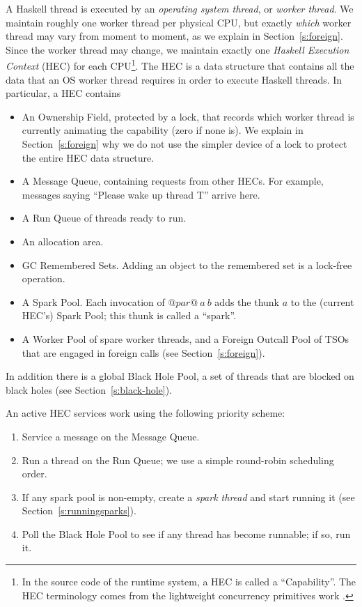 \documentclass[twocolumn,9pt]{sigplanconf}
\begin{document}
A Haskell thread is executed by an \emph{operating system thread}, or
\emph{worker thread}.  We maintain roughly one worker thread per
physical CPU, but exactly \emph{which} worker thread may vary from moment
to moment, as we explain in Section~\ref{s:foreign}.
Since the worker thread may change, we maintain exactly one
\emph{Haskell Execution Context} (HEC) for each CPU\footnote{
In the source code of the runtime system, a HEC is called a
``Capability''.  The HEC terminology comes from the lightweight
concurrency primitives work \cite{concsubstrate07}.}.
The HEC is a
data structure that contains all the data that an OS worker thread
requires in order to execute Haskell threads.  In particular, a HEC
contains
\begin{itemize}
\item An Ownership Field, protected by a lock, that 
records which worker thread is currently animating the capability
(zero if none is).  We explain in Section~\ref{s:foreign} 
why we do not use the simpler
device of a lock to protect the entire HEC data structure.

\item A Message Queue, containing requests from other HECs.  For
example, messages saying ``Please wake up thread T'' arrive here.

\item A Run Queue of threads ready to run.

\item An allocation area.

\item GC Remembered Sets.  Adding an object to the remembered set is a
  lock-free operation.

\item A Spark Pool.
Each invocation of $@par@~a~b$ adds the thunk $a$ to the (current HEC's) 
Spark Pool; this thunk is called a ``spark''.

\item A Worker Pool of spare worker threads, and a 
Foreign Outcall Pool of TSOs that are engaged in foreign calls (see Section~\ref{s:foreign}).

\end{itemize}
In addition there is a global Black Hole Pool, a set of
threads that are blocked on black holes (see Section~\ref{s:black-hole}).

An active HEC services work using the following priority scheme:

\begin{enumerate}
\item Service a message on the Message Queue.
\item Run a thread on the Run Queue; we use a simple round-robin scheduling order.
\item If any spark pool is non-empty, create a \emph{spark thread} and
  start running it (see Section~\ref{s:runningsparks}).
\item Poll the Black Hole Pool to see if any thread has become runnable;
if so, run it.
\end{enumerate}
\end{document}
